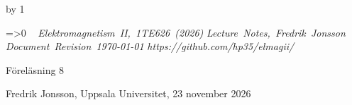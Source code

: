 {{{{{\cleardoublepage
%
%
%
%
%
%
%
\def\coursename{Elektromagnetism II}
\def\coursecode{1TE626}
\def\courseyear{2026}
\def\courserepo{https://github.com/hp35/elmagii/}
\def\lecturenumber{8}
\def\lecturetitle{Multipolutvecklingen}
\def\lecturesubtitle{}
\def\lectureauthor{Fredrik Jonsson}
\def\lectureplace{Uppsala Universitet}
\def\lecturedate{23 november 2026}
\edef\expandedlecturenumber{8}
\def\ifempty#1{\ifx\relax#1\relax}
\advance\chapno by 1
\immediate{}
\hsize=150mm\hoffset=4.6mm\vsize=230mm\voffset=7mm
\topskip=0pt\baselineskip=12pt\parskip=0pt\leftskip=0pt\parindent=15pt
\ifcolors
  \voffset=-10.2mm\topskip=0pt
\fi
\headline={\ifnum\secno>0\ifodd\pageno\rightheadline\else\leftheadline\fi
  \else\hfill\fi}
\def\rightheadline{\tenrm{\it F\"orel\"asning 8}
  \hfil{\it \coursename, \coursecode\ (\courseyear)}}
\def\leftheadline{\tenrm{\it \coursename, \coursecode\ (\courseyear)}
  \hfil{\it F\"orel\"asning 8}}
\noindent~\vskip-60pt\hskip-40pt{}
\vskip-42pt\hfill\vbox{
    \hbox{{\it \coursename, \coursecode\ (\courseyear)}}
    \hbox{{\it Lecture Notes, \lectureauthor}}
    \hbox{{\it Document Revision \today}}
    \hbox{{\it \courserepo}}}\vskip 36pt
\centerline{\twelvesc F\"orel\"asning 8}
\vskip 24pt\noindent
\centerline{}
\expandafter\ifempty\expandafter{\lecturesubtitle}%
  \else\centerline{\twelvesc\lecturesubtitle}\fi
\bigskip
\centerline{\lectureauthor, \lectureplace, \lecturedate}
\vskip24pt



}}}}}
